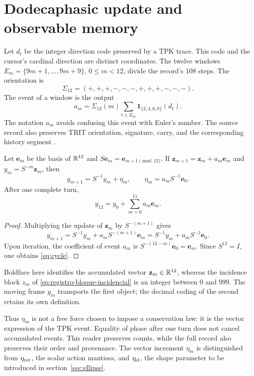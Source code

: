 \section{Dodecaphasic update and observable memory}
\label{sec:eta}
Let $d_t$ be the integer direction code preserved by a TPK trace.
This code and the cursor's cardinal direction are distinct coordinates.
The twelve windows
$E_m=\{9m+1,\ldots,9m+9\}$, $0\le m<12$, divide the record's 108 steps.
The orientation is
\[
\Sigma_{12}=(+,+,+,-,-,-,+,+,+,-,-,-).
\]
The event of a window is the output
\begin{equation}
a_m=\Sigma_{12}(m)
\sum_{t\in E_m}\mathbf1_{\{2,4,6,8\}}(d_t).
\label{eq:events}
\end{equation}
The notation $a_m$ avoids confusing this event with Euler's number.
The source record also preserves TRIT orientation, signature,
carry, and the corresponding history segment \cite{registro}.

\begin{proposition}
Let $\mathbf e_m$ be the basis of $\mathbb R^{12}$ and
$S\mathbf e_m=\mathbf e_{m+1\pmod{12}}$. If
$\mathbf z_{m+1}=\mathbf z_m+a_m\mathbf e_m$ and $y_m=S^{-m}\mathbf z_m$, then
\begin{equation}
y_{m+1}=S^{-1}y_m+\eta_m,
\qquad
\eta_m=a_mS^{-1}\mathbf e_0.
\label{eq:eta}
\end{equation}
After one complete turn,
\begin{equation}
y_{12}=y_0+\sum_{m=0}^{11}a_m\mathbf e_m.
\label{eq:cycle}
\end{equation}
\end{proposition}
\begin{proof}
Multiplying the update of $\mathbf z_m$ by $S^{-(m+1)}$ gives
\[
y_{m+1}=S^{-1}y_m+a_mS^{-(m+1)}\mathbf e_m
=S^{-1}y_m+a_mS^{-1}\mathbf e_0.
\]
Upon iteration, the coefficient of event $a_m$ is
$S^{-(12-m)}\mathbf e_0=\mathbf e_m$. Since $S^{12}=I$,
one obtains \eqref{eq:cycle}.
\end{proof}

Boldface here identifies the accumulated vector
\(\mathbf z_m\in\mathbb R^{12}\), whereas the incidence block
\(z_m\) of \eqref{eq:registro-bloque-incidencial} is an integer between
\(0\) and \(999\). The moving frame \(y_m\) transports the first object;
the decimal coding of the second retains its own definition.

Thus $\eta_m$ is not a free force chosen to impose a
conservation law: it is the vector expression of the TPK event. Equality of phase
after one turn does not cancel accumulated events. This reader
preserves counts, while the full record also preserves their
order and provenance. The vector increment $\eta_m$ is distinguished from
$\eta_{\rm ret}$, the scalar action mantissa, and $\eta_{\rm el}$,
the shape parameter to be introduced in section~\ref{sec:ellipse}.

